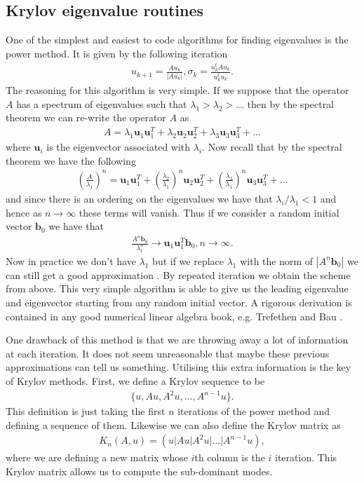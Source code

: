 \subsection{Krylov eigenvalue routines}
One of the simplest and easiest to code algorithms for finding eigenvalues is the power method. It is given by the following iteration \cite{MeyerLinAlg}
\begin{align}
u_{k+1}=\frac{Au_{k}}{|Au_{k}|}, \sigma_{k}=\frac{u_{k}^{t}Au_{k}}{u_{k}^{t}u_{k}}.
\end{align}
The reasoning for this algorithm is very simple. If we suppose that the operator $A$ has a spectrum of eigenvalues such that $\lambda_{1} > \lambda_{2} > \ldots $ then by the spectral theorem we can re-write the operator $A$ as
\begin{align}
A = \lambda_{1}\bm{u}_{1}\bm{u}_{1}^{T} + \lambda_{2}\bm{u}_{2}\bm{u}_{2}^{T} + \lambda_{3}\bm{u}_{3}\bm{u}_{3}^{T} + \ldots 
\end{align} 
where $\bm{u}_{i}$ is the eigenvector associated with $\lambda_{i}$. Now recall that by the spectral theorem we have the following \cite{MeyerLinAlg}
\begin{align}
\left(\frac{A}{\lambda_{1}}\right)^{n} = \bm{u}_{1}\bm{u}_{1}^{T} + \left(\frac{\lambda_{2}}{\lambda_{1}}\right)^{n}\bm{u}_{2}\bm{u}_{2}^{T} + \left(\frac{\lambda_{3}}{\lambda_{1}}\right)^{n}\bm{u}_{3}\bm{u}_{3}^{T} + \ldots 
\end{align}
and since there is an ordering on the eigenvalues we have that $\lambda_{i}/\lambda_{1}<1$ and hence as $n\rightarrow\infty$ these terms will vanish. Thus if we consider a random initial vector $\bm{b}_{0}$ we have that 
\begin{align}
\frac{A^{n}\bm{b}_{0}}{\lambda_{1}^{n}}\rightarrow \bm{u}_{1}\bm{u}_{1}^{T}\bm{b}_{0}, n\rightarrow\infty.
\end{align}
Now in practice we don't have $\lambda_{1}$ but if we replace $\lambda_{1}$ with the norm of $|A^{n}\bm{b}_{0}|$ we can still get a good approximation \cite{MeyerLinAlg}. By repeated iteration we obtain the scheme from above. This very simple algorithm is able to give us the leading eigenvalue and eigenvector starting from any random initial vector. A rigorous derivation is contained in any good numerical linear algebra book, e.g. Trefethen and Bau \cite{trefethen1997}.

One drawback of this method is that we are throwing away a lot of information at each iteration. It does not seem unreasonable that maybe these previous approximations can tell us something. Utilising this extra information is the key of Krylov methods. First, we define a Krylov sequence to be 
\begin{align}
\{u,Au,A^{2}u,\ldots,A^{n-1}u\}.
\end{align}
This definition is just taking the first $n$ iterations of the power method and defining a sequence of them. Likewise we can also define the Krylov matrix as 
\begin{align}
K_{n}(A,u)=(u|Au|A^{2}u|\ldots|A^{n-1}u),
\end{align}
where we are defining a new matrix whose $i$th column is the $i$ iteration. This Krylov matrix allows us to compute the sub-dominant modes.  

